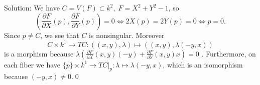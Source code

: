 \begin{enumerate}
Solution: We have $C=V(F)\subset k^2,\;F=X^2+Y^2-1$, so 
\begin{equation}
    (\frac{\partial F}{\partial X}(p), \frac{\partial F}{\partial Y}(p)) = 0 \iff 2X(p)=2Y(p)=0\iff p=0.
\end{equation}
Since $p\neq C$, we see that $C$ is nonsingular. Moreover 
\begin{equation}
    C\times k^1 \to TC:( (x,y),\lambda)\mapsto ((x,y),\lambda(-y,x))
\end{equation}
is a morphism because $\lambda(\tfrac{\partial F}{\partial X}(x,y)(-y)+\tfrac{\partial F}{\partial Y}(x,y)x)=0$
. Furthermore, on each fiber we have $\{p\}\times k^1\to TC|_p:\lambda\mapsto \lambda(-y,x)$, which is an isomorphism 
because $(-y,x)\neq 0$.\qed

\end{enumerate}

